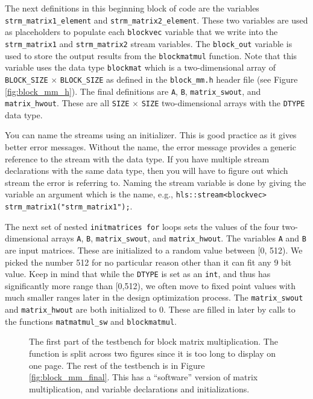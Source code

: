 The next definitions in this beginning block of code are the variables \lstinline{strm_matrix1_element} and \lstinline{strm_matrix2_element}. These two variables are used as placeholders to populate each \lstinline{blockvec} variable that we write into the \lstinline{strm_matrix1} and \lstinline{strm_matrix2} stream variables. The \lstinline{block_out} variable is used to store the output results from the \lstinline{blockmatmul} function. Note that this variable uses the data type \lstinline{blockmat} which is a two-dimensional array of \lstinline{BLOCK_SIZE} $\times$ \lstinline{BLOCK_SIZE} as defined in the \lstinline{block_mm.h} header file (see Figure \ref{fig:block_mm_h}). The final definitions are \lstinline{A},  \lstinline{B},  \lstinline{matrix_swout},  and \lstinline{matrix_hwout}. These are all \lstinline{SIZE} $\times$ \lstinline{SIZE} two-dimensional arrays with the \lstinline{DTYPE} data type. 

\begin{aside}
You can name the streams using an initializer. This is good practice as it gives better error messages. Without the name, the error message provides a generic reference to the stream with the data type. If you have multiple stream declarations with the same data type, then you will have to figure out which stream the error is referring to. Naming the stream variable is done by giving the variable an argument which is the name, e.g., \lstinline{hls::stream<blockvec> strm_matrix1("strm_matrix1");}.
\end{aside}

The next set of nested \lstinline{initmatrices for} loops sets the values of the four two-dimensional arrays \lstinline{A}, \lstinline{B}, \lstinline{matrix_swout}, and \lstinline{matrix_hwout}. The variables \lstinline{A} and \lstinline{B} are input matrices. These are initialized to a random value between [0, 512). We picked the number 512 for no particular reason other than it can fit any 9 bit value. Keep in mind that while the \lstinline{DTYPE} is set as an \lstinline{int}, and thus has significantly more range than [0,512), we often move to fixed point values with much smaller ranges later in the design optimization process. The \lstinline{matrix_swout} and \lstinline{matrix_hwout} are both initialized to $0$. These are filled in later by calls to the functions \lstinline{matmatmul_sw} and \lstinline{blockmatmul}.

\begin{figure}

\caption{  The first part of the testbench for block matrix multiplication. The function is split across two figures since it is too long to display on one page. The rest of the testbench is in Figure \ref{fig:block_mm_final}. This has a ``software'' version of matrix multiplication, and variable declarations and initializations. }
\label{fig:block_mm_init}
\end{figure}

